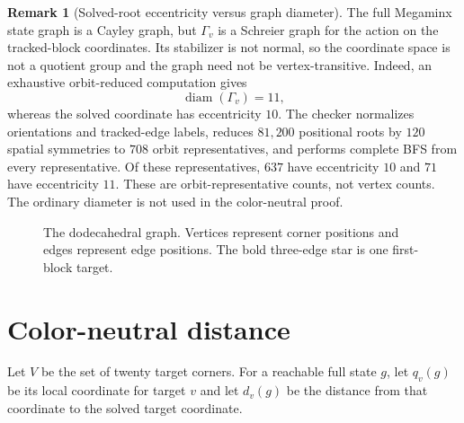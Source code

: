 \documentclass[11pt]{article}
\theoremstyle{definition}
\newtheorem{remark}[theorem]{Remark}
\begin{document}
\begin{remark}[Solved-root eccentricity versus graph diameter]
The full Megaminx state graph is a Cayley graph, but $\Gamma_v$ is a Schreier graph for the action on the tracked-block coordinates.  Its stabilizer is not normal, so the coordinate space is not a quotient group and the graph need not be vertex-transitive.  Indeed, an exhaustive orbit-reduced computation gives
\[
\operatorname{diam}(\Gamma_v)=11,
\]
whereas the solved coordinate has eccentricity $10$.  The checker normalizes orientations and tracked-edge labels, reduces $81{,}200$ positional roots by $120$ spatial symmetries to $708$ orbit representatives, and performs complete BFS from every representative.  Of these representatives, $637$ have eccentricity $10$ and $71$ have eccentricity $11$.  These are orbit-representative counts, not vertex counts.  The ordinary diameter is not used in the color-neutral proof.
\end{remark}

\begin{figure}[ht]
\centering
{}
\caption{The dodecahedral graph.  Vertices represent corner positions and edges represent edge positions.  The bold three-edge star is one first-block target.}
\label{fig:dodecahedral-graph}
\end{figure}

\section{Color-neutral distance}

Let $V$ be the set of twenty target corners.  For a reachable full state $g$, let $q_v(g)$ be its local coordinate for target $v$ and let $d_v(g)$ be the distance from that coordinate to the solved target coordinate.
\end{document}

